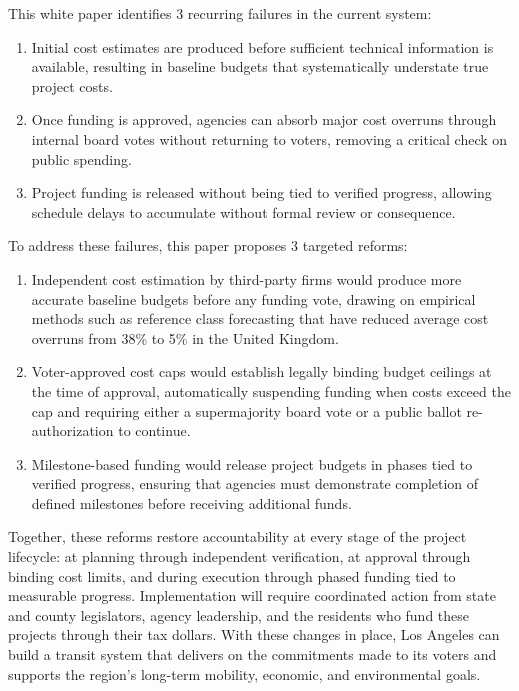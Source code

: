 \documentclass[12pt]{article}
\begin{document}
    This white paper identifies 3 recurring failures in the current system:
    \begin{enumerate}
        \item Initial cost estimates are produced before sufficient technical information is available, resulting in baseline budgets that systematically understate true project costs.
        \item Once funding is approved, agencies can absorb major cost overruns through internal board votes without returning to voters, removing a critical check on public spending.
        \item Project funding is released without being tied to verified progress, allowing schedule delays to accumulate without formal review or consequence.
    \end{enumerate}

    To address these failures, this paper proposes 3 targeted reforms:
    \begin{enumerate}
        \item Independent cost estimation by third-party firms would produce more accurate baseline budgets before any funding vote, drawing on empirical methods such as reference class forecasting that have reduced average cost overruns from 38\% to 5\% in the United Kingdom.
        \item Voter-approved cost caps would establish legally binding budget ceilings at the time of approval, automatically suspending funding when costs exceed the cap and requiring either a supermajority board vote or a public ballot re-authorization to continue.
        \item Milestone-based funding would release project budgets in phases tied to verified progress, ensuring that agencies must demonstrate completion of defined milestones before receiving additional funds.
    \end{enumerate}

    Together, these reforms restore accountability at every stage of the project lifecycle: at planning through independent verification, at approval through binding cost limits, and during execution through phased funding tied to measurable progress. Implementation will require coordinated action from state and county legislators, agency leadership, and the residents who fund these projects through their tax dollars. With these changes in place, Los Angeles can build a transit system that delivers on the commitments made to its voters and supports the region's long-term mobility, economic, and environmental goals.
\end{document}
